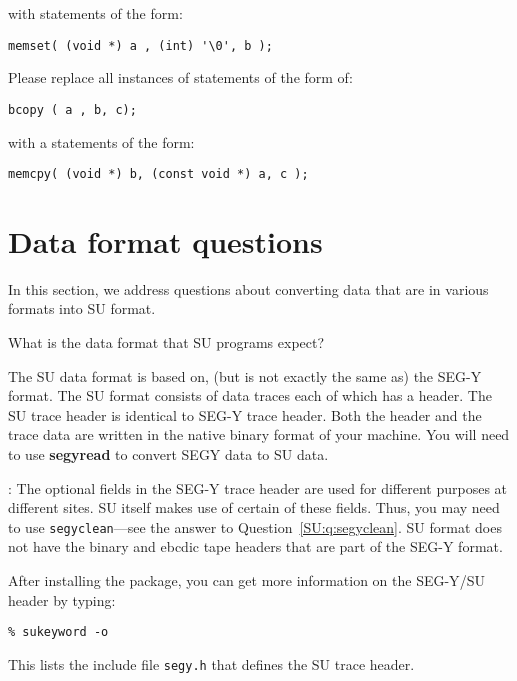 {{{{{{{\begin{rmans}
with statements of the form:

{\small \begin{verbatim}
memset( (void *) a , (int) '\0', b );
\end{verbatim}} \noindent

Please replace all instances
of statements of the form of:
{\small \begin{verbatim}
bcopy ( a , b, c);
\end{verbatim}} \noindent
with a statements of the form:
{\small \begin{verbatim}
memcpy( (void *) b, (const void *) a, c );
\end{verbatim}} \noindent
\end{rmans}

\section{Data format questions}

In this section, we address questions about converting data
that are in various formats into {\small\sf SU} format.

\begin{question}
What is the data format that {\small\sf SU} programs expect?
\end{question}

\begin{rmans}
The {\small\sf SU} data format is based on, (but is not exactly the same as)
the {\sf SEG-Y} format. The {\small\sf SU} format
consists of data traces each of which has a header.
The {\small\sf SU} trace header is identical to {\sf SEG-Y} trace header.
Both the header and the trace data are written in the
native binary format of your machine.
You will need to use {\bf segyread\/} to convert SEGY data to SU data.

: The optional fields
in the {\sf SEG-Y} trace header are used for different purposes
at different sites.  {\small\sf SU} itself makes use of certain of these fields.
Thus, you may need to use {\tt segyclean}---see the answer to
Question~\ref{SU:q:segyclean}.
{\small\sf SU} format does not have the binary and ebcdic tape headers that
are part of the {\sf SEG-Y} format.

After installing the package, you can get more information on the
{\sf SEG-Y}/{\small\sf SU} header by typing: 
{\small \begin{verbatim}
% sukeyword -o
\end{verbatim}}\noindent
This lists the include file {\tt segy.h} that defines the {\small\sf SU} trace header.
\end{rmans}

}}}}}}}
